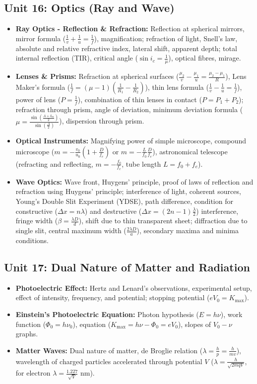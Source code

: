 \documentclass[11pt,a4paper]{article}
\begin{document}
\subsection{Unit 16: Optics (Ray and Wave)}
\begin{itemize}
  \item \textbf{Ray Optics - Reflection \& Refraction:} Reflection at spherical mirrors, mirror formula ($\frac{1}{v} + \frac{1}{u} = \frac{1}{f}$), magnification; refraction of light, Snell's law, absolute and relative refractive index, lateral shift, apparent depth; total internal reflection (TIR), critical angle ($\sin i_c = \frac{1}{\mu}$), optical fibres, mirage.
  \item \textbf{Lenses \& Prisms:} Refraction at spherical surfaces ($\frac{\mu_2}{v} - \frac{\mu_1}{u} = \frac{\mu_2 - \mu_1}{R}$), Lens Maker's formula ($\frac{1}{f} = (\mu - 1)(\frac{1}{R_1} - \frac{1}{R_2})$), thin lens formula ($\frac{1}{v} - \frac{1}{u} = \frac{1}{f}$), power of lens ($P = \frac{1}{f}$), combination of thin lenses in contact ($P = P_1 + P_2$); refraction through prism, angle of deviation, minimum deviation formula ($\mu = \frac{\sin(\frac{A + \delta_m}{2})}{\sin(\frac{A}{2})}$), dispersion through prism.
  \item \textbf{Optical Instruments:} Magnifying power of simple microscope, compound microscope ($m = -\frac{v_0}{u_0}(1 + \frac{D}{f_e})$ or $m = -\frac{L}{f_0}\frac{D}{f_e}$), astronomical telescope (refracting and reflecting, $m = -\frac{f_0}{f_e}$, tube length $L = f_0 + f_e$).
  \item \textbf{Wave Optics:} Wave front, Huygens' principle, proof of laws of reflection and refraction using Huygens' principle; interference of light, coherent sources, Young's Double Slit Experiment (YDSE), path difference, condition for constructive ($\Delta x = n\lambda$) and destructive ($\Delta x = (2n-1)\frac{\lambda}{2}$) interference, fringe width ($\beta = \frac{\lambda D}{d}$), shift due to thin transparent sheet; diffraction due to single slit, central maximum width ($\frac{2\lambda D}{a}$), secondary maxima and minima conditions.
\end{itemize}

\subsection{Unit 17: Dual Nature of Matter and Radiation}
\begin{itemize}
  \item \textbf{Photoelectric Effect:} Hertz and Lenard's observations, experimental setup, effect of intensity, frequency, and potential; stopping potential ($eV_0 = K_{\max}$).
  \item \textbf{Einstein's Photoelectric Equation:} Photon hypothesis ($E = h\nu$), work function ($\Phi_0 = h\nu_0$), equation ($K_{\max} = h\nu - \Phi_0 = eV_0$), slopes of $V_0-\nu$ graphs.
  \item \textbf{Matter Waves:} Dual nature of matter, de Broglie relation ($\lambda = \frac{h}{p} = \frac{h}{mv}$), wavelength of charged particles accelerated through potential $V$ ($\lambda = \frac{h}{\sqrt{2mqV}}$, for electron $\lambda = \frac{1.227}{\sqrt{V}}\text{ nm}$).
\end{itemize}
\end{document}
